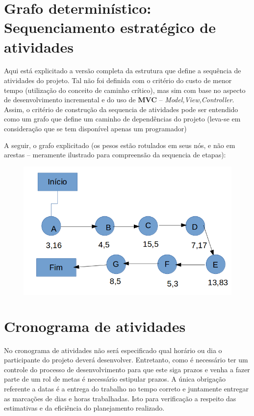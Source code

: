 \documentclass[12pt,a4paper]{article}
\begin{document}
		\section{Grafo determinístico: Sequenciamento estratégico de atividades}
		\paragraph{} Aqui está explicitado a versão completa da estrutura que define a sequência de atividades do projeto. Tal não foi definida com o critério do custo de menor tempo (utilização do conceito de caminho crítico), mas sim com base no aspecto de desenvolvimento incremental e do uso de \textbf{MVC} -- \textit{Model,View,Controller}. Assim, o critério de construção da sequencia de atividades pode ser entendido como um grafo que define um caminho de dependências do projeto (leva-se em consideração que se tem disponível apenas um programador)
		
		A seguir, o grafo explicitado (os pesos estão rotulados em seus nós, e não em arestas -- meramente ilustrado para compreensão da sequencia de etapas): 
		
		\begin{figure}[!ht]
			\centering
			\includegraphics[scale=0.7]{004.png}
		\end{figure}
		
		\section{Cronograma de atividades}
		\paragraph{} No cronograma de atividades não será especificado qual horário ou dia o participante do projeto deverá desenvolver. Entretanto, como é necessário ter um controle do processo de desenvolvimento para que este siga prazos e venha a fazer parte de um rol de metas é necessário estipular prazos. A única obrigação referente a datas é a entrega do trabalho no tempo correto e juntamente entregar as marcações de dias e horas trabalhadas. Isto para verificação a respeito das estimativas e da eficiência do planejamento realizado.
		
\end{document}
